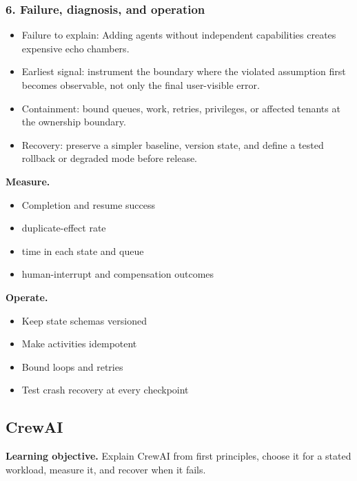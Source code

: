 \subsubsection*{6. Failure, diagnosis, and operation}
\begin{itemize}
\item Failure to explain: Adding agents without independent capabilities creates expensive echo chambers.
\item Earliest signal: instrument the boundary where the violated assumption first becomes observable, not only the final user-visible error.
\item Containment: bound queues, work, retries, privileges, or affected tenants at the ownership boundary.
\item Recovery: preserve a simpler baseline, version state, and define a tested rollback or degraded mode before release.
\end{itemize}
\textbf{Measure.}\begin{itemize}
\item Completion and resume success
\item duplicate-effect rate
\item time in each state and queue
\item human-interrupt and compensation outcomes
\end{itemize}
\textbf{Operate.}\begin{itemize}
\item Keep state schemas versioned
\item Make activities idempotent
\item Bound loops and retries
\item Test crash recovery at every checkpoint
\end{itemize}
\subsection{CrewAI}
\textbf{Learning objective.} Explain CrewAI from first principles, choose it for a stated workload, measure it, and recover when it fails.
